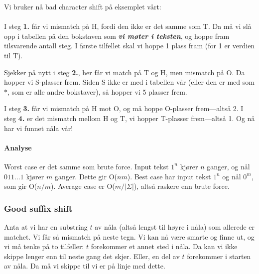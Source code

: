 \begin{example}
\noindent Vi bruker nå bad character shift på eksemplet vårt: \vspace{10pt}\\
\vspace{10pt}\\
I steg \textbf{1.} får vi mismatch på H, fordi den ikke er det samme som T. Da må vi slå opp i tabellen på den bokstaven som \textbf{\textit{vi møter i teksten}}, og hoppe fram tilsvarende antall steg. I første tilfellet skal vi hoppe 1 plass fram (for 1 er verdien til T). 

Sjekker på nytt i steg \textbf{2.}, her får vi match på T og H, men mismatch på O. Da hopper vi S-plasser frem. Siden S ikke er med i tabellen vår (eller den er med som $*$, som er alle andre bokstaver), så hopper vi 5 plasser frem.

I steg \textbf{3.} får vi mismatch på H mot O, og må hoppe O-plasser frem---altså 2. I steg \textbf{4.} er det mismatch mellom H og T, vi hopper T-plasser frem---altså 1. Og nå har vi funnet nåla vår!

\end{example}

\paragraph{Analyse}
Worst case er det samme som brute force. Input tekst $1^n$ kjører $n$ ganger, og nål $011\dots1$ kjører $m$ ganger. Dette gir O($nm$). Best case har input tekst $1^n$ og nål $0^m$, som gir O($n/m$). Average case er O($m/|\Sigma|$), altså raskere enn brute force.
	
	\subsubsection{Good suffix shift}
		Anta at vi har en substring $t$ av nåla (altså lengst til høyre i nåla) som allerede er matchet. Vi får så mismatch på neste tegn. Vi kan nå være smarte og finne ut, og
		vi må tenke på to tilfeller: $t$ forekommer et annet sted i nåla. Da kan vi ikke skippe lenger enn til neste gang det skjer. Eller, en del av $t$ forekommer i starten av nåla. Da må vi skippe til vi er på linje med dette.
	
